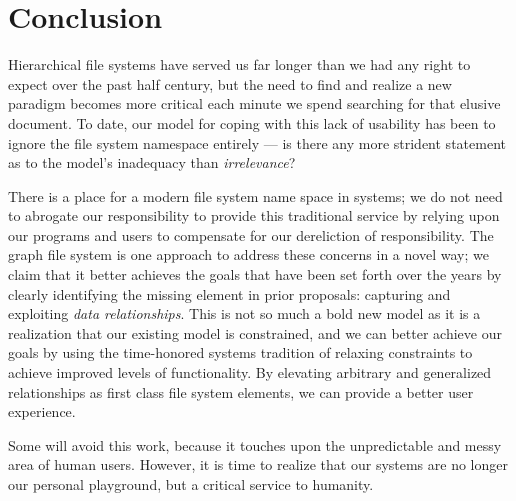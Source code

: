
\section{Conclusion}\label{sec:conclusion}

Hierarchical file systems have served us far longer than we had any right
to expect over the past half century, but the need to find and realize a
new paradigm becomes more critical each minute we spend searching for that
elusive document.
To date, our model for coping with this lack of usability has been to ignore
the file system namespace entirely --- is there any more strident
statement as to the model's inadequacy than \textit{irrelevance}?

There is a place for a modern file system name space in systems;
we do not need to abrogate our responsibility to provide this traditional
service by relying upon our programs and users to compensate for our dereliction
of responsibility.
The graph file system is one approach to address these concerns in
a novel way; we claim that it
better achieves the goals that have been set forth over the years by clearly
identifying the missing element in prior proposals: capturing and exploiting
\textit{data relationships}.
This is not so much a bold new model as it is 
a realization that our existing model is constrained, and we can better
achieve our goals by using the time-honored systems tradition of relaxing
constraints to achieve improved levels of functionality.
By elevating arbitrary and generalized relationships as first class file
system elements, we can provide a better user experience. 

Some will avoid this work, because it touches upon the unpredictable and
messy area of human users.
However, it is time to realize that our systems are no longer our personal
playground, but a critical service to humanity.



